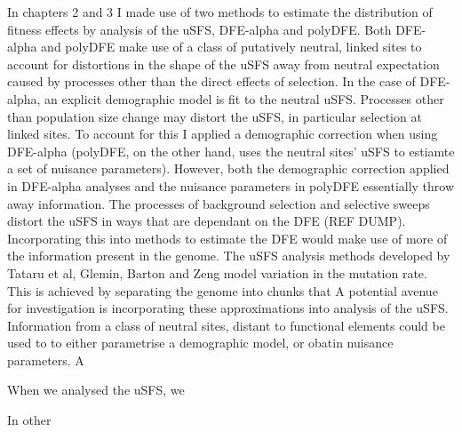 In chapters 2 and 3 I made use of two methods to estimate the distribution of fitness effects by analysis of the uSFS, DFE-alpha and polyDFE. Both DFE-alpha and polyDFE make use of a class of putatively neutral, linked sites to account for distortions in the shape of the uSFS away from  neutral expectation caused by processes other than the direct effects of selection. In the case of DFE-alpha, an explicit demographic model is fit to the neutral uSFS. Processes other than population size change may distort the uSFS, in particular selection at linked sites. To account for this I applied a demographic correction when using DFE-alpha (polyDFE, on the other hand, uses the neutral sites' uSFS to estiamte a set of  nuisance parameters). However, both the demographic correction applied in DFE-alpha analyses and the nuisance parameters in polyDFE essentially throw away information. The processes of background selection and selective sweeps distort the uSFS in ways that are dependant on the DFE (REF DUMP). 
Incorporating this into methods to estimate the DFE would make use of more of the information present in the genome. The uSFS analysis methods developed by Tataru et al, Glemin, Barton and Zeng model variation in the mutation rate. This is achieved by separating the genome into chunks that 
A potential avenue for investigation is incorporating these approximations into analysis of the uSFS. Information from a class of neutral sites, distant to functional elements could be used to to either parametrise a demographic model, or obatin nuisance parameters. A 

When we analysed the uSFS, we 


In other 

